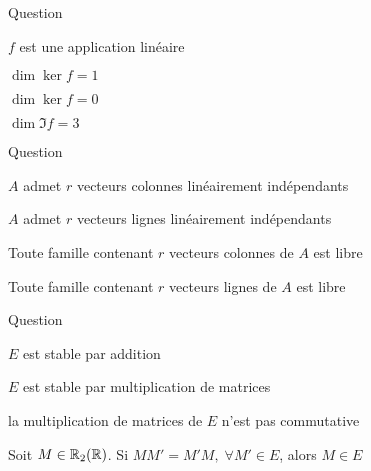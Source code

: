 \begin{multi}[multiple,feedback=
{On vérifie que \(f\) est une application linéaire, \(\ker f =\{0\}\) et \(\Im f = M_2(\Rr)\). Donc \(\dim \ker f = 0\) et \( \dim \Im f = 4\).
}]{Question}
    \item* \(f\) est une application linéaire
    \item \(\dim \ker f = 1\)
    \item* \(\dim \ker f = 0\)
    \item \(\dim \Im f = 3\)
\end{multi}


\begin{multi}[multiple,feedback=
{Le rang d'une matrice est le nombre maximum de vecteurs colonnes ou  lignes qui sont linéairement indépendants.
}]{Question}
    \item* \(A\) admet \(r\) vecteurs colonnes linéairement indépendants
    \item* \(A\) admet \(r\) vecteurs lignes linéairement indépendants
    \item Toute famille contenant \(r\) vecteurs colonnes de \(A\) est libre
    \item Toute famille contenant \(r\) vecteurs lignes de \(A\) est libre
\end{multi}


\begin{multi}[multiple,feedback=
{On vérifie que \(E\) est stable par addition et par multiplication de matrices et que la multiplication de matrices de \(E\) est commutative.
\vskip0mm
Soit \(M \in \Rr_2(\Rr)\). On vérifie que si \(MM'=M'M,\) pour toute matrice \(M'\) de \( E\), alors \(M\in E\).
}]{Question}
    \item* \(E\) est stable par addition
    \item* \(E\) est stable par multiplication de matrices
    \item la multiplication de matrices de \(E\) n'est pas commutative
    \item* Soit \(M \in \Rr_2(\Rr)\). Si \(MM'=M'M, \; \forall M' \in E\), alors \(M\in E\)
\end{multi}


